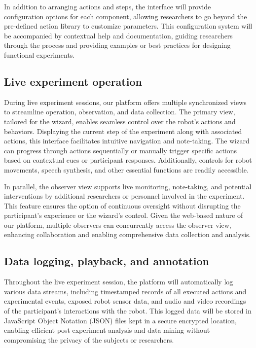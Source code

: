 \documentclass[letterpaper, 10 pt, conference]{ieeeconf}
\begin{document}
In addition to arranging actions and steps, the interface will provide configuration options for each component, allowing researchers to go beyond the pre-defined action library to customize parameters. This configuration system will be accompanied by contextual help and documentation, guiding researchers through the process and providing examples or best practices for designing functional experiments.

\subsection{Live experiment operation}

During live experiment sessions, our platform offers multiple synchronized views to streamline operation, observation, and data collection. The primary view, tailored for the wizard, enables seamless control over the robot's actions and behaviors. Displaying the current step of the experiment along with associated actions, this interface facilitates intuitive navigation and note-taking. The wizard can progress through actions sequentially or manually trigger specific actions based on contextual cues or participant responses. Additionally, controls for robot movements, speech synthesis, and other essential functions are readily accessible.

In parallel, the observer view supports live monitoring, note-taking, and potential interventions by additional researchers or personnel involved in the experiment. This feature ensures the option of continuous oversight without disrupting the participant's experience or the wizard's control. Given the web-based nature of our platform, multiple observers can concurrently access the observer view, enhancing collaboration and enabling comprehensive data collection and analysis.

\subsection{Data logging, playback, and annotation}

Throughout the live experiment session, the platform will automatically log various data streams, including timestamped records of all executed actions and experimental events, exposed robot sensor data, and audio and video recordings of the participant's interactions with the robot. This logged data will be stored in JavaScript Object Notation (JSON) files kept in a secure encrypted location, enabling efficient post-experiment analysis and data mining without compromising the privacy of the subjects or researchers.
\end{document}
